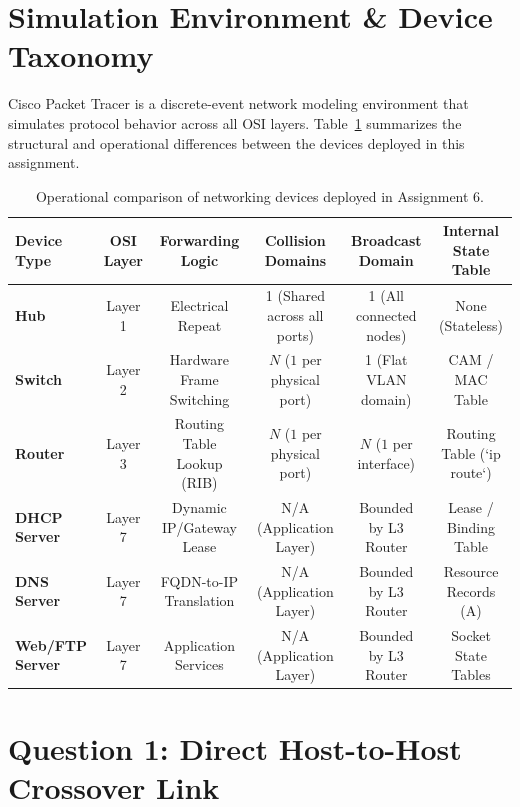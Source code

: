 \documentclass[11pt,a4paper]{article}
\begin{document}
\tableofcontents
\newpage

\section{Simulation Environment \& Device Taxonomy}

Cisco Packet Tracer is a discrete-event network modeling environment that simulates protocol behavior across all OSI layers. Table~\ref{tab:device_comparison} summarizes the structural and operational differences between the devices deployed in this assignment.

\begin{table}[H]
\centering
\small
\caption{Operational comparison of networking devices deployed in Assignment 6.}
\label{tab:device_comparison}
\begin{tabularx}{\textwidth}{lccccc}
\toprule
\textbf{Device Type} & \textbf{OSI Layer} & \textbf{Forwarding Logic} & \textbf{Collision Domains} & \textbf{Broadcast Domain} & \textbf{Internal State Table} \\
\midrule
\textbf{Hub} & Layer 1 & Electrical Repeat & 1 (Shared across all ports) & 1 (All connected nodes) & None (Stateless) \\
\textbf{Switch} & Layer 2 & Hardware Frame Switching & $N$ ($1$ per physical port) & 1 (Flat VLAN domain) & CAM / MAC Table \\
\textbf{Router} & Layer 3 & Routing Table Lookup (RIB) & $N$ ($1$ per physical port) & $N$ ($1$ per interface) & Routing Table (`ip route`) \\
\textbf{DHCP Server} & Layer 7 & Dynamic IP/Gateway Lease & N/A (Application Layer) & Bounded by L3 Router & Lease / Binding Table \\
\textbf{DNS Server} & Layer 7 & FQDN-to-IP Translation & N/A (Application Layer) & Bounded by L3 Router & Resource Records (A) \\
\textbf{Web/FTP Server} & Layer 7 & Application Services & N/A (Application Layer) & Bounded by L3 Router & Socket State Tables \\
\bottomrule
\end{tabularx}
\end{table}

\newpage

\section{Question 1: Direct Host-to-Host Crossover Link}
\end{document}
